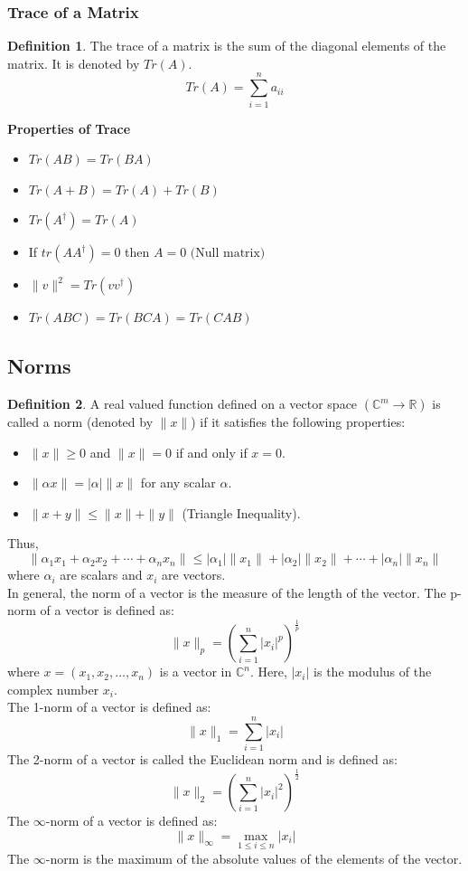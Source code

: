 \documentclass[12pt, oneside]{book}
\theoremstyle{definition}
\newtheorem{definition}{Definition}[section]
\theoremstyle{definition}
\theoremstyle{remark}
\begin{document}
\subsubsection{Trace of a Matrix}
\begin{definition} 
    The trace of a matrix is the sum of the diagonal elements of the matrix. It is denoted by $Tr(A)$.
    \[ Tr(A)=\sum_{i=1}^n a_{ii} \]
\end{definition}
\textbf{Properties of Trace}
\begin{itemize}
    \item $Tr(AB)=Tr(BA)$
    \item $Tr(A+B)=Tr(A)+Tr(B)$
    \item $Tr(A^{\dagger})=Tr(A)$
    \item If $tr(AA^{\dagger})=0$ then $A=0 \text{ (Null matrix)}$
    \item $\|v\|^2=Tr(vv^{\dagger})$
    \item $Tr(ABC)=Tr(BCA)=Tr(CAB)$
\end{itemize}
\subsection{Norms}
\begin{definition}
    A real valued function defined on a vector space $(\mathbb{C}^m \rightarrow \mathbb{R})$ is called a norm (denoted by $\|x\|$) 
    if it satisfies the following properties:
    \begin{itemize}
        \item $\|x\| \geq 0$ and $\|x\|=0$ if and only if $x=0$.
        \item $\|\alpha x\|=|\alpha|\|x\|$ for any scalar $\alpha$.
        \item $\|x+y\| \leq \|x\|+\|y\|$ (Triangle Inequality).
    \end{itemize}
\end{definition}
Thus, 
\[\|\alpha_1x_1+\alpha_2x_2 + \cdots +\alpha_n x_n\| \leq |\alpha_1|\|x_1\|+|\alpha_2|\|x_2\| + \cdots + |\alpha_n|\|x_n\| \]
where $\alpha_i$ are scalars and $x_i$ are vectors.\\
In general, the norm of a vector is the measure of the length of the vector.
The p-norm of a vector is defined as:
\[ \|x\|_p=(\sum_{i=1}^n |x_i|^p)^{\frac{1}{p}} \]
where $x=(x_1,x_2,\ldots,x_n)$ is a vector in $\mathbb{C}^n$. Here, $|x_i|$ is the modulus of the complex number $x_i$.\\
The 1-norm of a vector is defined as:
\[ \|x\|_1=\sum_{i=1}^n |x_i| \]
The 2-norm of a vector is called the Euclidean norm and is defined as:
\[ \|x\|_2=(\sum_{i=1}^n |x_i|^2)^{\frac{1}{2}} \]
The $\infty$-norm of a vector is defined as:
\[ \|x\|_{\infty}=\max_{1\leq i \leq n} |x_i| \]
The $\infty$-norm is the maximum of the absolute values of the elements of the vector.\\
\end{document}
